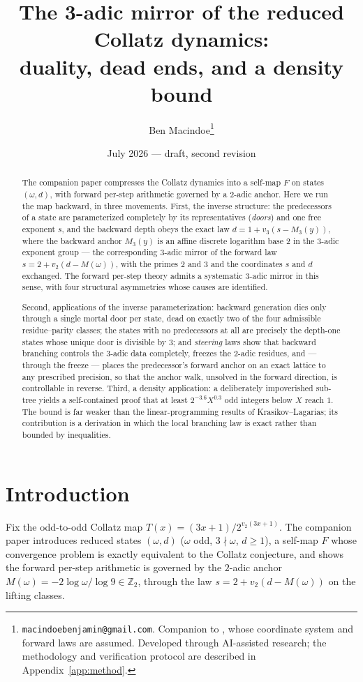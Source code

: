 \documentclass[11pt]{article}
\title{The 3-adic mirror of the reduced Collatz dynamics:\\ duality, dead ends, and a density bound}
\author{Ben Macindoe\thanks{\texttt{macindoebenjamin@gmail.com}. Companion to \cite{paper1}, whose coordinate system and forward laws are assumed. Developed through AI-assisted research; the methodology and verification protocol are described in Appendix~\ref{app:method}.}}
\date{July 2026 --- draft, second revision}
\theoremstyle{remark}
\newcommand{\Z}{\mathbb{Z}}
\newcommand{\vt}[1]{v_2\!\left(#1\right)}
\newcommand{\vth}[1]{v_3\!\left(#1\right)}
\newcommand{\w}{\omega}
\begin{document}
\maketitle

\begin{abstract}
The companion paper \cite{paper1} compresses the Collatz dynamics into a self-map $F$ on states $(\w,d)$, with forward per-step arithmetic governed by a $2$-adic anchor. Here we run the map backward, in three movements. First, the inverse structure: the predecessors of a state are parameterized completely by its representatives (\emph{doors}) and one free exponent $s$, and the backward depth obeys the exact law $d = 1 + \vth{s - M_3(y)}$, where the backward anchor $M_3(y)$ is an affine discrete logarithm base $2$ in the $3$-adic exponent group --- the corresponding $3$-adic mirror of the forward law $s = 2 + \vt{d - M(\w)}$, with the primes $2$ and $3$ and the coordinates $s$ and $d$ exchanged. The forward per-step theory admits a systematic $3$-adic mirror in this sense, with four structural asymmetries whose causes are identified.

Second, applications of the inverse parameterization: backward generation dies only through a single mortal door per state, dead on exactly two of the four admissible residue--parity classes; the states with no predecessors at all are precisely the depth-one states whose unique door is divisible by $3$; and \emph{steering} laws show that backward branching controls the $3$-adic data completely, freezes the $2$-adic residues, and --- through the freeze --- places the predecessor's forward anchor on an exact lattice to any prescribed precision, so that the anchor walk, unsolved in the forward direction, is controllable in reverse. Third, a density application: a deliberately impoverished sub-tree yields a self-contained proof that at least $2^{-3.6}X^{0.3}$ odd integers below $X$ reach $1$. The bound is far weaker than the linear-programming results of Krasikov--Lagarias; its contribution is a derivation in which the local branching law is exact rather than bounded by inequalities.
\end{abstract}

\section{Introduction}

Fix the odd-to-odd Collatz map $T(x) = (3x+1)/2^{\vt{3x+1}}$. The companion paper \cite{paper1} introduces reduced states $(\w, d)$ ($\w$ odd, $3\nmid\w$, $d \ge 1$), a self-map $F$ whose convergence problem is exactly equivalent to the Collatz conjecture, and shows the forward per-step arithmetic is governed by the $2$-adic anchor $M(\w) = -2\log\w/\log 9 \in \Z_2$, through the law $s = 2 + \vt{d - M(\w)}$ on the lifting classes.
\end{document}
